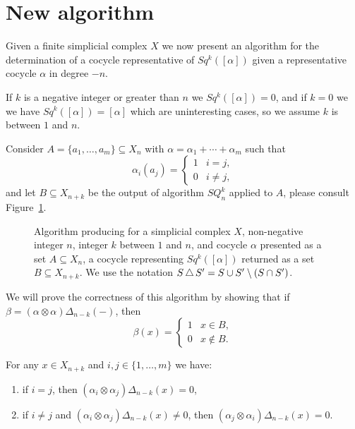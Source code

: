 
\section{New algorithm} \label{s:algorithm}

Given a finite simplicial complex $X$ we now present an algorithm for the determination of a cocycle representative of $Sq^k([\alpha])$ given a representative cocycle $\alpha$ in degree $-n$.

If $k$ is a negative integer or greater than $n$ we $Sq^k([\alpha]) = 0$, and if $k = 0$ we we have $Sq^k([\alpha]) = [\alpha]$ which are uninteresting cases, so we assume $k$ is between $1$ and $n$.

Consider $A = \{a_1, \dots, a_m\} \subseteq X_n$ with $\alpha = \alpha_1 + \cdots + \alpha_m$ such that
\begin{equation*}
\alpha_i(a_j) = \begin{cases}
1 & i=j, \\ 0 & i\neq j,
\end{cases}
\end{equation*}
and let $B \subseteq X_{n+k}$ be the output of algorithm $SQ_n^k$ applied to $A$, please consult Figure~\ref{f:algorithm}.
\begin{figure}[h]
	
	\caption{Algorithm producing for a simplicial complex $X$, non-negative integer $n$, integer $k$ between $1$ and $n$, and cocycle $\alpha$ presented as a set $A \subseteq X_n$, a cocycle representing $Sq^k([\alpha])$ returned as a set $B \subseteq X_{n+k}$.
	We use the notation $S \operatorname{\triangle} S^\prime = S \cup S^\prime \setminus (S \cap S^\prime)$.}
	\label{f:algorithm}
\end{figure}
We will prove the correctness of this algorithm by showing that if $\beta = (\alpha \otimes \alpha)\Delta_{n-k}(-)$, then
\begin{equation*}
\beta(x) =
\begin{cases}
1 & x \in B, \\
0 & x \not\in B.
\end{cases}
\end{equation*}

\begin{lemma} \label{l:freeness}
	For any $x \in X_{n+k}$ and $i,j \in \{1,\dots,m\}$ we have:
	\begin{enumerate}
		\item if $i=j$, then $(\alpha_i \otimes \alpha_j)\Delta_{n-k}(x) = 0$,
		\item if $i \neq j$ and $(\alpha_i \otimes \alpha_j)\Delta_{n-k}(x) \neq 0$, then $(\alpha_j \otimes \alpha_i)\Delta_{n-k}(x) = 0$.
	\end{enumerate}
\end{lemma}

